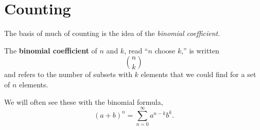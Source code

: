 \chapter{Counting}

The basis of much of counting is the idea of the \emph{binomial coefficient}.
\begin{defn}
  The \textbf{binomial coefficient} of $n$ and $k$, read ``$n$ choose $k$,'' is written
  \[ n \choose k \]
  and refers to the number of subsets with $k$ elements that we could find for a set of $n$ elements.
\end{defn}

We will often see these with the binomial formula,
\begin{equation}
  (a+b)^n = \sum^\infty_{n=0} a^{n-k}b^k.
  \label{eq:binform}
\end{equation}

